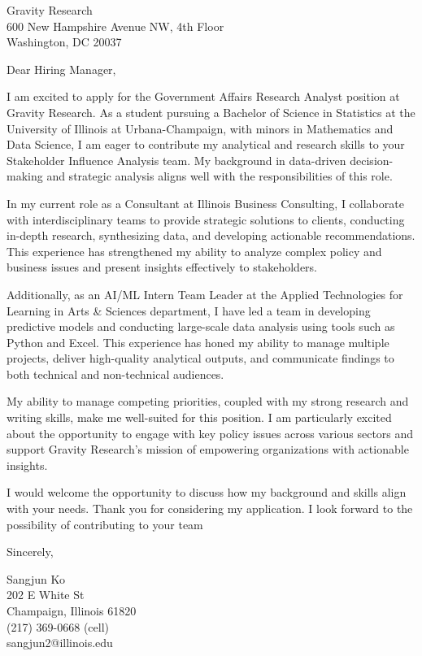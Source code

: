 \documentclass{letter}
\begin{document}
\begin{letter}{Gravity Research\\
    600 New Hampshire Avenue NW, 4th Floor\\
    Washington, DC 20037
    }


\opening{Dear Hiring Manager,}

I am excited to apply for the Government Affairs Research Analyst position at Gravity Research. As a student pursuing a Bachelor of Science in Statistics at the University of Illinois at Urbana-Champaign, with minors in Mathematics and Data Science, I am eager to contribute my analytical and research skills to your Stakeholder Influence Analysis team. My background in data-driven decision-making and strategic analysis aligns well with the responsibilities of this role.

In my current role as a Consultant at Illinois Business Consulting, I collaborate with interdisciplinary teams to provide strategic solutions to clients, conducting in-depth research, synthesizing data, and developing actionable recommendations. This experience has strengthened my ability to analyze complex policy and business issues and present insights effectively to stakeholders.

Additionally, as an AI/ML Intern Team Leader at the Applied Technologies for Learning in Arts \& Sciences department, I have led a team in developing predictive models and conducting large-scale data analysis using tools such as Python and Excel. This experience has honed my ability to manage multiple projects, deliver high-quality analytical outputs, and communicate findings to both technical and non-technical audiences.

My ability to manage competing priorities, coupled with my strong research and writing skills, make me well-suited for this position. I am particularly excited about the opportunity to engage with key policy issues across various sectors and support Gravity Research's mission of empowering organizations with actionable insights.

I would welcome the opportunity to discuss how my background and skills align with your needs. Thank you for considering my application. I look forward to the possibility of contributing to your team


\closing{Sincerely,
}

Sangjun Ko\\
202 E White St\\
Champaign, Illinois 61820\\
(217) 369-0668 (cell)\\sangjun2@illinois.edu
\end{letter}
\end{document}

